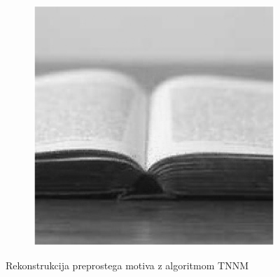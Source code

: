 \begin{figure}
\begin{subfigure}{0.325\linewidth}
    \end{subfigure}
    \hfill
    \begin{subfigure}{0.325\linewidth}
        \includegraphics[width=\linewidth]{Poglavja/Slike/kompleksnost/preprosta grayscale 300/rez60TNNM.png}
    \end{subfigure}
    \caption{Rekonstrukcija preprostega motiva z algoritmom TNNM}
\end{figure}

